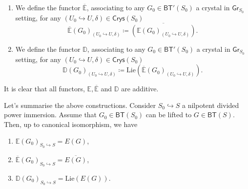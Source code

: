 \documentclass[../Main]{subfiles}
\begin{document}
\begin{defn}[]\leavevmode\vspace{-.2\baselineskip}
\begin{enumerate}
\item We define the functor $\overline{\mathbb{E}}$, associating to
	any $G_0 \in \mathsf{BT}'(S_0)$ a crystal in $\mathsf{Gr}_{S_0}$
	setting, for any $\left(U_0 \hookrightarrow U, \delta\right) \in \mathsf{Crys}(S_0)$
	\begin{equation*}
		\overline{\mathbb{E}}(G_0)_{\left(U_0 \hookrightarrow U, \delta\right)} \coloneqq
		\overline{\left( \mathbb{E}(G_0)_{\left(U_0 \hookrightarrow U, \delta\right)} \right)}
	.\end{equation*}

\item We define the functor $\mathbb{D}$, associating to
	any $G_0 \in \mathsf{BT}'(S_0)$ a crystal in $\mathsf{Gr}_{S_0}$
	setting, for any $\left(U_0 \hookrightarrow U, \delta\right) \in \mathsf{Crys}(S_0)$
	\begin{equation*}
		\mathbb{D}(G_0)_{\left(U_0 \hookrightarrow U, \delta\right)} \coloneqq
		\mathrm{Lie}
		\left( \overline{\mathbb{E}}(G_0)_{\left(U_0 \hookrightarrow U, \delta\right)} \right)
	.\end{equation*}
\end{enumerate}
\end{defn}


\begin{rem}[]
	It is clear that all functors, $\mathbb{E}, \overline{\mathbb{E}}$ and
	$\mathbb{D}$ are additive.
\end{rem}


\begin{rem}[]
	Let's summarise the above constructions.
	Consider $S_0 \hookrightarrow S$ a nilpotent divided power immersion.
	Assume that $G_0 \in \mathsf{BT}(S_0)$ can be lifted to $G \in \mathsf{BT}(S)$.
	Then, up to canonical isomorphism, we have
\begin{enumerate}
	\item $\mathbb{E}(G_0)_{S_0 \hookrightarrow S} = E(G)$,
	\item $\overline{\mathbb{E}}(G_0)_{S_0 \hookrightarrow S} = \overline{E(G)}$,
	\item $\mathbb{D}(G_0)_{S_0 \hookrightarrow S} = 
		\mathrm{Lie}(E(G))$.
\end{enumerate}
\end{rem}
\end{document}

